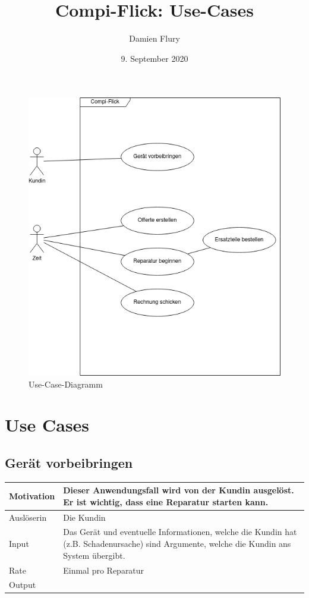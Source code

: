 \documentclass[a4paper]{scrartcl}
\title{Compi-Flick: Use-Cases}
\author{Damien Flury}
\date{9. September 2020}
\begin{document}
\maketitle
\begin{figure}
  \includegraphics[width=\textwidth]{images/compi-flick-use-case.png}
  \caption{Use-Case-Diagramm}
\end{figure}

\section{Use Cases}
\subsection{Gerät vorbeibringen}
\begin{tabularx}{\textwidth}{|l|X|}
  \hline
  Motivation & Dieser Anwendungsfall wird von
  der Kundin ausgelöst. Er ist wichtig, dass eine
  Reparatur starten kann. \\ \hline
  Auslöserin & Die Kundin \\ \hline
  Input & Das Gerät und eventuelle Informationen, welche
  die Kundin hat (z.B. Schadenursache) sind Argumente, welche
  die Kundin ans System übergibt. \\ \hline
  Rate & Einmal pro Reparatur \\ \hline
  Output & 
\end{tabularx}
\end{document}
